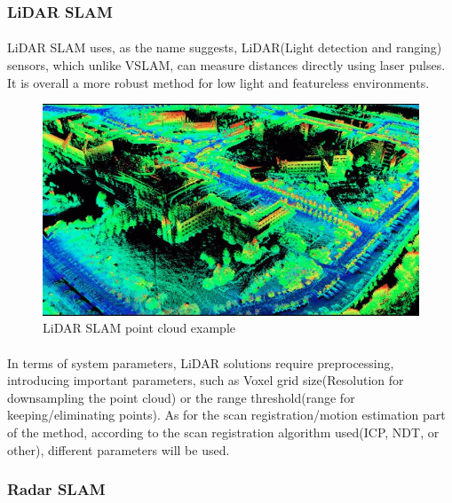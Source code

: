 \subsubsection{LiDAR SLAM}
\paragraph{}LiDAR SLAM uses, as the name suggests, LiDAR(Light detection and ranging) sensors, which unlike VSLAM, can measure distances directly using laser pulses. It is overall a more robust method for low light and featureless environments.\cite{lidar_sota}
\begin{figure}[h]
    \centering
    \includegraphics[width=0.75\linewidth]{images/lidar_SLAM.jpg}
    \caption{LiDAR SLAM point cloud example}
    \label{fig:enter-label}
\end{figure}
\paragraph{}In terms of system parameters, LiDAR solutions require preprocessing, introducing important parameters, such as Voxel grid size(Resolution for downsampling the point cloud) or the range threshold(range for keeping/eliminating points)\cite{lidar_sota}. As for the scan registration/motion estimation part of the method, according to the scan registration algorithm used(\ac{ICP}, \ac{NDT}, or other), different parameters will be used\cite{lidar_sota}.

\subsubsection{Radar SLAM}
